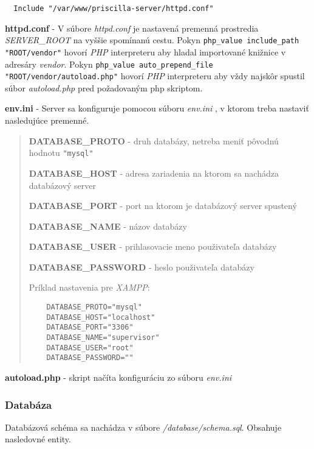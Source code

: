 \documentclass{article}
\newcommand{\filedesc}[1]{\vspace{0.3cm} \noindent \textbf{#1}}
\newcommand{\file}[1]{\emph{#1}}
\begin{document}
\begin{verbatim}
  Include "/var/www/priscilla-server/httpd.conf"
\end{verbatim}

\filedesc{httpd.conf} - V súbore \file{httpd.conf} je nastavená premenná prostredia \emph{SERVER{\_}ROOT} na vyššie spomínanú cestu. Pokyn \texttt{php_value include_path "ROOT/vendor"} hovorí \emph{PHP} interpreteru aby hladal importované knižnice v adresáry \file{vendor}. Pokyn \texttt{php_value auto_prepend_file "ROOT/vendor/autoload.php"} hovorí \emph{PHP} interpreteru aby vždy najskôr spustil súbor \file{autoload.php} pred požadovaným php skriptom.

\filedesc{env.ini} - Server sa konfiguruje pomocou súboru \file{env.ini} , v ktorom treba nastaviť nasledujúce premenné.

\begin{quote}
  \filedesc{DATABASE{\_}PROTO} - druh databázy, netreba meniť pôvodnú hodnotu \texttt{"mysql"}

  \filedesc{DATABASE{\_}HOST} - adresa zariadenia na ktorom sa nachádza databázový server 

  \filedesc{DATABASE{\_}PORT} - port na ktorom je databázový server spustený

  \filedesc{DATABASE{\_}NAME} - názov databázy

  \filedesc{DATABASE{\_}USER} - prihlasovacie meno použivateľa databázy

  \filedesc{DATABASE{\_}PASSWORD} - heslo použivateľa databázy

  Príklad nastavenia pre \emph{XAMPP}:

  \begin{verbatim}
    DATABASE_PROTO="mysql"
    DATABASE_HOST="localhost"
    DATABASE_PORT="3306"
    DATABASE_NAME="supervisor"
    DATABASE_USER="root"
    DATABASE_PASSWORD=""
  \end{verbatim}
\end{quote}

\filedesc{autoload.php} - skript načíta konfiguráciu zo súboru \file{env.ini}

\subsubsection{Databáza}

Databázová schéma sa nachádza v súbore \file{/database/schema.sql}. Obsahuje nasledovné entity.
\end{document}
